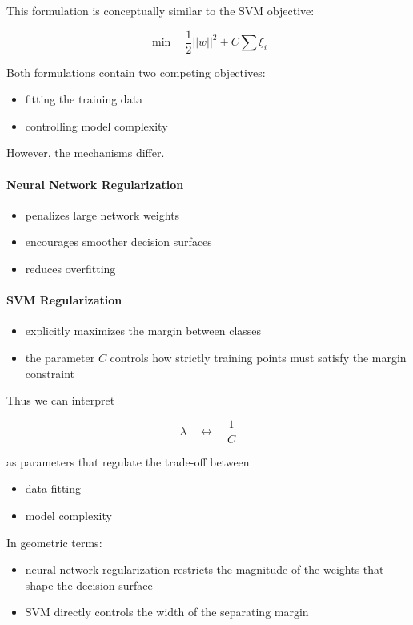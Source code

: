 \documentclass[12pt]{article}
\begin{document}
This formulation is conceptually similar to the SVM objective:

\[
\min
\quad
\frac12 ||w||^2
+
C \sum \xi_i
\]

Both formulations contain two competing objectives:

\begin{itemize}
\item fitting the training data
\item controlling model complexity
\end{itemize}

However, the mechanisms differ.

\paragraph{Neural Network Regularization}

\begin{itemize}
\item penalizes large network weights
\item encourages smoother decision surfaces
\item reduces overfitting
\end{itemize}

\paragraph{SVM Regularization}

\begin{itemize}
\item explicitly maximizes the margin between classes
\item the parameter $C$ controls how strictly training points must satisfy the margin constraint
\end{itemize}

Thus we can interpret

\[
\lambda \quad \leftrightarrow \quad \frac{1}{C}
\]

as parameters that regulate the trade-off between

\begin{itemize}
\item data fitting
\item model complexity
\end{itemize}

In geometric terms:

\begin{itemize}
\item neural network regularization restricts the magnitude of the weights that shape the decision surface
\item SVM directly controls the width of the separating margin
\end{itemize}
\end{document}
